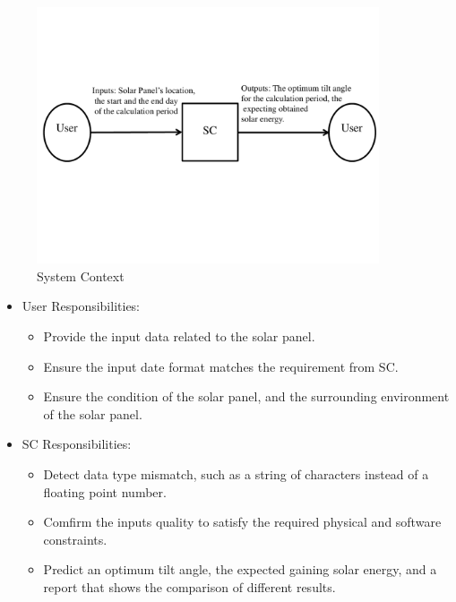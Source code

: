 \documentclass[12pt]{article}
\begin{document}
\begin{figure}[H]
\begin{center}
 \includegraphics[width=0.9\textwidth]{SystemContextFigure}
\caption{System Context}
\label{Fig_SystemContext} 
\end{center}
\end{figure}

\medskip

\begin{itemize}
\item User Responsibilities:
\begin{itemize}
\item Provide the input data related to the solar panel. 
\item Ensure the input date format matches the requirement from SC.
\item Ensure the condition of the solar panel, and the surrounding environment of the solar panel.
\end{itemize}
\item SC Responsibilities:
\begin{itemize}
\item Detect data type mismatch, such as a string of characters instead of a
  floating point number.
\item Comfirm the inputs quality to satisfy the required physical and software constraints.
\item Predict an optimum tilt angle, the expected gaining solar energy, and a report that shows the comparison of different results.

\end{itemize}
\end{itemize}
\end{document}

